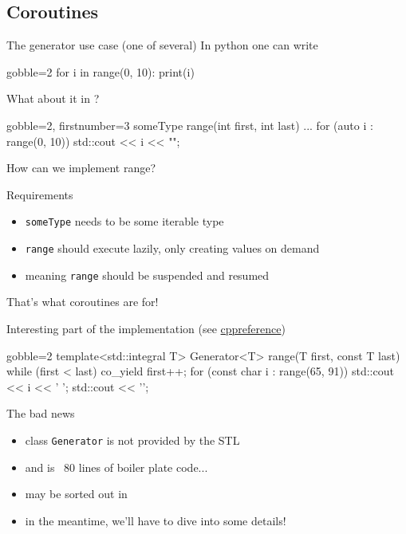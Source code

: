 \subsection{Coroutines}

\begin{frame}[fragile]
  \begin{block}{The generator use case (one of several)}
    In python one can write
    {\scriptsize
      \begin{pythoncode*}{gobble=2}
        for i in range(0, 10):
          print(i)
      \end{pythoncode*}
    }
    What about it in \cpp?
    {\scriptsize
      \begin{cppcode*}{gobble=2, firstnumber=3}
        someType range(int first, int last) { ... }
        for (auto i : range(0, 10)) {
          std::cout << i << "\n";
        }
      \end{cppcode*}
    }
    How can we implement range?
  \end{block}
  \begin{exampleblock}{Requirements}
    \begin{itemize}
    \item \texttt{someType} needs to be some iterable type
    \item \texttt{range} should execute lazily, only creating values on demand
    \item meaning \texttt{range} should be suspended and resumed
    \end{itemize}
    That's what coroutines are for!
  \end{exampleblock}
\end{frame}

\begin{frame}[fragile]
  \begin{exampleblock}{Interesting part of the implementation (see \href{https://en.cppreference.com/w/cpp/coroutine/coroutine\_handle\#Example}{\color{blue!50!white}cppreference})}
    {\scriptsize
      \begin{cppcode*}{gobble=2}
        template<std::integral T>
        Generator<T> range(T first, const T last) {
          while (first < last) {
            co_yield first++;
          }
        }
        for (const char i : range(65, 91)) {
          std::cout << i << ' ';
        }
        std::cout << '\n';
      \end{cppcode*}
    }
  \end{exampleblock}
  \begin{alertblock}{The bad news}
    \begin{itemize}
    \item class \texttt{Generator} is not provided by the STL
    \item and is ~80 lines of boiler plate code...
    \item may be sorted out in 
    \item in the meantime, we'll have to dive into some details!
    \end{itemize}
  \end{alertblock}
\end{frame}

